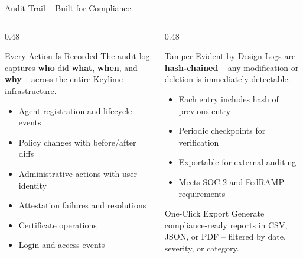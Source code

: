 \begin{frame}{Audit Trail -- Built for Compliance}
  \begin{columns}[T]
    \begin{column}{0.48\textwidth}
      \begin{block}{Every Action Is Recorded}
        \scriptsize
        The audit log captures \textbf{who} did \textbf{what},
        \textbf{when}, and \textbf{why} -- across the entire
        Keylime infrastructure.
      \end{block}
      \scriptsize
      \begin{itemize}
        \item Agent registration and lifecycle events
        \item Policy changes with before/after diffs
        \item Administrative actions with user identity
        \item Attestation failures and resolutions
        \item Certificate operations
        \item Login and access events
      \end{itemize}
    \end{column}
    \begin{column}{0.48\textwidth}
      \begin{block}{Tamper-Evident by Design}
        \scriptsize
        Logs are \textbf{hash-chained} -- any modification
        or deletion is immediately detectable.
      \end{block}
      \scriptsize
      \begin{itemize}
        \item Each entry includes hash of previous entry
        \item Periodic checkpoints for verification
        \item Exportable for external auditing
        \item Meets SOC 2 and FedRAMP requirements
      \end{itemize}

      \vspace{0.2cm}

      \begin{exampleblock}{One-Click Export}
        \scriptsize
        Generate compliance-ready reports in CSV, JSON,
        or PDF -- filtered by date, severity, or category.
      \end{exampleblock}
    \end{column}
  \end{columns}
\end{frame}
